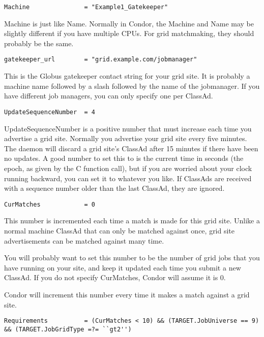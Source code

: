 \footnotesize
\begin{verbatim}
Machine               = "Example1_Gatekeeper"
\end{verbatim}
\normalsize

Machine is just like Name. Normally in Condor, the Machine and Name
may be slightly different if you have multiple CPUs. For grid
matchmaking, they should probably be the same.

\footnotesize
\begin{verbatim}
gatekeeper_url        = "grid.example.com/jobmanager"
\end{verbatim}
\normalsize

This is the Globus gatekeeper contact string for your grid site. It is
probably a machine name followed by a slash followed by the name of
the jobmanager. If you have different job managers, you can only
specify one per ClassAd. 

\begin{verbatim}
UpdateSequenceNumber  = 4
\end{verbatim}

UpdateSequenceNumber is a positive number that must increase each time
you advertise a grid site. Normally you advertise your grid site
every five minutes. The  daemon will discard a grid site's
ClassAd after 15 minutes if there have been no updates. A good number
to set this to is the current time in seconds (the epoch, as given by
the C  function call), but if you are worried about your clock
running backward, you can set it to whatever you like. If ClassAds are
received with a sequence number older than the last ClassAd, they are
ignored. 

\begin{verbatim}
CurMatches            = 0
\end{verbatim}

This number is incremented each time a match is made for this grid
site. Unlike a normal machine ClassAd that can only be matched against
once, grid site advertisements can be matched against many time. 

You will probably want to set this number to be the number of grid
jobs that you have running on your site, and keep it updated each time
you submit a new ClassAd. If you do not specify CurMatches, Condor
will assume it is 0.

Condor will increment this number every time it makes a match against
a grid site.

\footnotesize
\begin{verbatim}
Requirements          = (CurMatches < 10) && (TARGET.JobUniverse == 9) && (TARGET.JobGridType =?= ``gt2'')
\end{verbatim}
\normalsize

